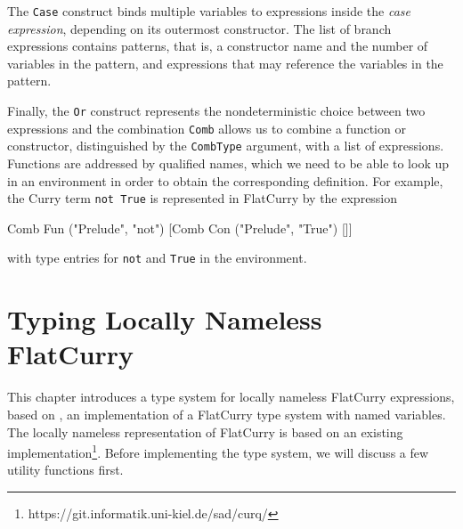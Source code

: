 \documentclass[a4paper, 11pt, fleqn]{scrreprt}
\newcommand{\coqinline}[1]{\texttt{#1}}
\begin{document}
	\par
	The \coqinline{Case} construct binds multiple variables to expressions inside the \textit{case expression}, depending on its outermost constructor. The list of branch expressions contains patterns, that is, a constructor name and the number of variables in the pattern, and expressions that may reference the variables in the pattern.
	\par
	Finally, the \coqinline{Or} construct represents the nondeterministic choice between two expressions and the combination \coqinline{Comb} allows us to combine a function or constructor, distinguished by the \coqinline{CombType} argument, with a list of expressions. Functions are addressed by qualified names, which we need to be able to look up in an environment in order to obtain the corresponding definition. For example, the Curry term \coqinline{not True} is represented in FlatCurry by the expression
	\begin{coqcode}
Comb Fun ("Prelude", "not") [Comb Con ("Prelude", "True") []]
	\end{coqcode}
	with type entries for \coqinline{not} and \coqinline{True} in the environment. 
\chapter{Typing Locally Nameless FlatCurry}
	This chapter introduces a type system for locally nameless FlatCurry expressions, based on \citep{Curroqe}, an implementation of a FlatCurry type system with named variables. The locally nameless representation of FlatCurry is based on an existing implementation\footnote{https://git.informatik.uni-kiel.de/sad/curq/}. Before implementing the type system, we will discuss a few utility functions first.
\end{document}
